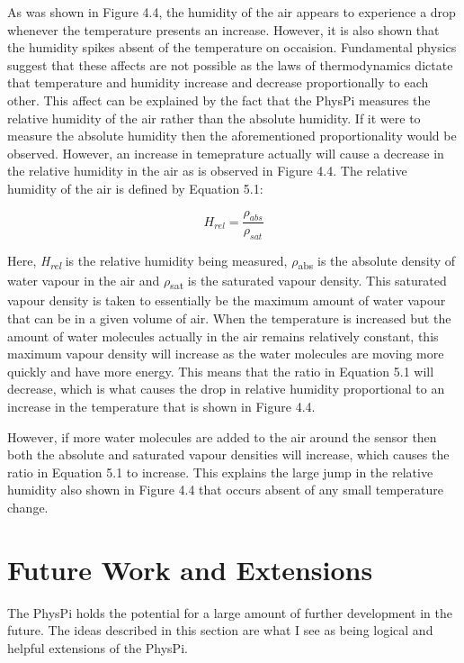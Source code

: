 \documentclass[letterpaper, 11pt]{report}
\begin{document}
As was shown in Figure 4.4, the humidity of the air appears to experience a drop whenever the temperature presents an increase. However, it is also shown that the humidity spikes absent of the temperature on occaision.  Fundamental physics suggest that these affects are not possible as the laws of thermodynamics dictate that temperature and humidity increase and decrease proportionally to each other.  This affect can be explained by the fact that the PhysPi measures the relative humidity of the air rather than the absolute humidity.  If it were to measure the absolute humidity then the aforementioned proportionality would be observed.  However, an increase in temeprature actually will cause a decrease in the relative humidity in the air as is observed in Figure 4.4.  The relative humidity of the air is defined by Equation 5.1: 

\begin{equation}
H_{rel} = \frac{\rho_{abs}}{\rho_{sat}}
\end{equation}

Here, \textit{H\textsubscript{rel}} is the relative humidity being measured, $\rho$\textsubscript{abs} is the absolute density of water vapour in the air and $\rho$\textsubscript{sat} is the saturated vapour density.  This saturated vapour density is taken to essentially be the maximum amount of water vapour that can be in a given volume of air.  When the temperature is increased but the amount of water molecules actually in the air remains relatively constant, this maximum vapour density will increase as the water molecules are moving more quickly and have more energy.  This means that the ratio in Equation 5.1 will decrease, which is what causes the drop in relative humidity proportional to an increase in the temperature that is shown in Figure 4.4.

However, if more water molecules are added to the air around the sensor then both the absolute and saturated vapour densities will increase, which causes the ratio in Equation 5.1 to increase.  This explains the large jump in the relative humidity also shown in Figure 4.4 that occurs absent of any small temperature change.

\section{Future Work and Extensions}

The PhysPi holds the potential for a large amount of further development in the future.  The ideas described in this section are what I see as being logical and helpful extensions of the PhysPi.
\end{document}
